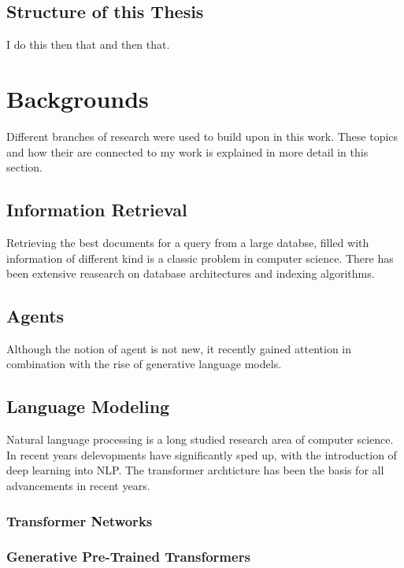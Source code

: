 \documentclass[english, version-2022-01]{uzl-thesis}
\begin{document}
\section{Structure of this Thesis}
I do this then that and then that.

\chapter{Backgrounds}

Different branches of research were used to build upon in this work.
These topics and how their are connected to my work
is explained in more detail in this section.

\section{Information Retrieval}

Retrieving the best documents for a query from a large databse,
filled with information of different kind is a classic problem in computer science.
There has been extensive reasearch on database architectures and indexing algorithms.

\section{Agents}

Although the notion of agent is not new,
it recently gained attention in combination with the rise of generative language models.

\section{Language Modeling}

Natural language processing is a long studied research area of computer science.
In recent years delevopments have significantly sped up,
with the introduction of deep learning into NLP.
The transformer archticture has been the basis for all advancements in recent years.

\subsection{Transformer Networks}
\label{subsec:transformer}


\subsection{Generative Pre-Trained Transformers}
\label{subsec:gpt}

\end{document}
